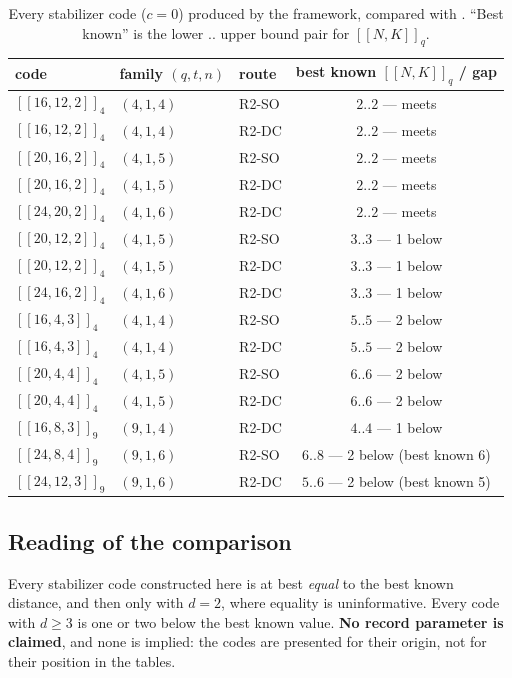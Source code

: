 \begin{table}[t]
\centering
\caption{Every stabilizer code ($c=0$) produced by the framework, compared
with \cite{GrasslCodetables}. ``Best known'' is the lower .. upper bound
pair for $[[N,K]]_q$.}
\label{tab:comparison}
\begin{tabular}{@{}lllc@{}}
\toprule
code & family $(q,t,n)$ & route & best known $[[N,K]]_q$ / gap\\
\midrule
$[[16,12,2]]_4$ & $(4,1,4)$ & R2-SO & $2..2$ --- meets\\
$[[16,12,2]]_4$ & $(4,1,4)$ & R2-DC & $2..2$ --- meets\\
$[[20,16,2]]_4$ & $(4,1,5)$ & R2-SO & $2..2$ --- meets\\
$[[20,16,2]]_4$ & $(4,1,5)$ & R2-DC & $2..2$ --- meets\\
$[[24,20,2]]_4$ & $(4,1,6)$ & R2-DC & $2..2$ --- meets\\[2pt]
$[[20,12,2]]_4$ & $(4,1,5)$ & R2-SO & $3..3$ --- 1 below\\
$[[20,12,2]]_4$ & $(4,1,5)$ & R2-DC & $3..3$ --- 1 below\\
$[[24,16,2]]_4$ & $(4,1,6)$ & R2-DC & $3..3$ --- 1 below\\[2pt]
$[[16,4,3]]_4$  & $(4,1,4)$ & R2-SO & $5..5$ --- 2 below\\
$[[16,4,3]]_4$  & $(4,1,4)$ & R2-DC & $5..5$ --- 2 below\\
$[[20,4,4]]_4$  & $(4,1,5)$ & R2-SO & $6..6$ --- 2 below\\
$[[20,4,4]]_4$  & $(4,1,5)$ & R2-DC & $6..6$ --- 2 below\\[2pt]
$[[16,8,3]]_9$  & $(9,1,4)$ & R2-DC & $4..4$ --- 1 below\\
$[[24,8,4]]_9$  & $(9,1,6)$ & R2-SO & $6..8$ --- 2 below (best known 6)\\
$[[24,12,3]]_9$ & $(9,1,6)$ & R2-DC & $5..6$ --- 2 below (best known 5)\\
\bottomrule
\end{tabular}
\end{table}

\subsection{Reading of the comparison}

Every stabilizer code constructed here is at best \emph{equal} to the best known
distance, and then only with $d=2$, where equality is uninformative. Every code
with $d\ge3$ is one or two below the best known value. \textbf{No record
parameter is claimed}, and none is implied: the codes are presented for their
origin, not for their position in the tables.

